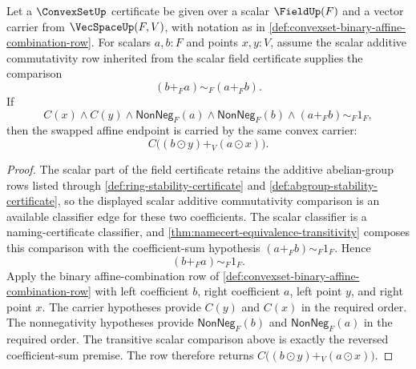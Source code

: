 \begin{theorem}
\label{thm:convexset-affine-combination-row-order-symmetric}
Let a $\ConvexSetUp$ certificate be given over a scalar $\FieldUp(F)$ and a
vector carrier from $\VecSpaceUp(F,V)$, with notation as in
\autoref{def:convexset-binary-affine-combination-row}. For scalars $a,b:F$
and points $x,y:V$, assume the scalar additive commutativity row inherited from
the scalar field certificate supplies the comparison
$$
(b+_F a)\sim_F(a+_F b).
$$
If
$$
C(x)\land C(y)\land \mathsf{NonNeg}_F(a)\land \mathsf{NonNeg}_F(b)
\land (a+_F b)\sim_F 1_F,
$$
then the swapped affine endpoint is carried by the same convex carrier:
$$
C\bigl((b\odot y)+_V(a\odot x)\bigr).
$$
\end{theorem}
\begin{proof}
The scalar part of the field certificate retains the additive abelian-group
rows listed through \autoref{def:ring-stability-certificate} and
\autoref{def:abgroup-stability-certificate}, so the displayed scalar additive
commutativity comparison is an available classifier edge for these two
coefficients. The scalar classifier is a naming-certificate classifier, and
\autoref{thm:namecert-equivalence-transitivity} composes this comparison with
the coefficient-sum hypothesis $(a+_F b)\sim_F1_F$. Hence
$$
(b+_F a)\sim_F1_F.
$$
Apply the binary affine-combination row of
\autoref{def:convexset-binary-affine-combination-row} with left coefficient
$b$, right coefficient $a$, left point $y$, and right point $x$. The carrier
hypotheses provide $C(y)$ and $C(x)$ in the required order. The nonnegativity
hypotheses provide $\mathsf{NonNeg}_F(b)$ and $\mathsf{NonNeg}_F(a)$ in the
required order. The transitive scalar comparison above is exactly the reversed
coefficient-sum premise. The row therefore returns
$C\bigl((b\odot y)+_V(a\odot x)\bigr)$.
\end{proof}

